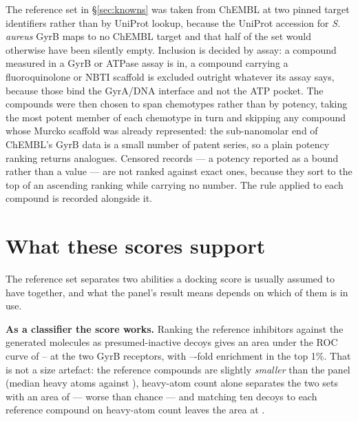 \documentclass[11pt,a4paper]{article}
\begin{document}
The reference set in \S\ref{sec:knowns} was taken from ChEMBL at two pinned
target identifiers rather than by UniProt lookup, because the UniProt
accession for \textit{S.\,aureus} GyrB maps to no ChEMBL target and that half
of the set would otherwise have been silently empty. Inclusion is decided by
assay: a compound measured in a GyrB or ATPase assay is in, a compound
carrying a fluoroquinolone or NBTI scaffold is excluded outright whatever its
assay says, because those bind the GyrA/DNA interface and not the ATP pocket.
The \nKnowns{} compounds were then chosen to span chemotypes rather than by
potency, taking the most potent member of each chemotype in turn and skipping
any compound whose Murcko scaffold was already represented: the sub-nanomolar
end of ChEMBL's GyrB data is a small number of patent series, so a plain
potency ranking returns analogues. Censored records --- a potency reported
as a bound rather than a value --- are not ranked against exact ones, because
they sort to the top of an ascending ranking while carrying no number. The
rule applied to each compound is recorded alongside it.

\begin{table}[tb]
\centering
\caption{Panel, score distribution and redocking validation. RMSD values are
in \AA. ``Best'' is the closest of the nine retained poses and ``rank'' its
position in Vina's ordering.}
\label{tab:receptors}
\small

\end{table}

\section{What these scores support}
\label{sec:direction}

The reference set separates two abilities a docking score is usually assumed
to have together, and what the panel's result means depends on which of them
is in use.

\textbf{As a classifier the score works.} Ranking the \nKnowns{} reference
inhibitors against the \nMolecules{} generated molecules as presumed-inactive
decoys gives an area under the ROC curve of \knownsAucLo{}--\knownsAucHi{} at
the two GyrB receptors, with \knownsEfLo--\knownsEfHi-fold enrichment in the
top 1\%. That is not a size artefact: the reference compounds are slightly
\emph{smaller} than the panel (median \knownsHeavyMedian{} heavy atoms
against \heavyMedian), heavy-atom count alone separates the two sets with an
area of \knownsAucNull{} --- worse than chance --- and matching ten decoys to
each reference compound on heavy-atom count leaves the area at
\knownsAucMatchedLo{}.
\end{document}
